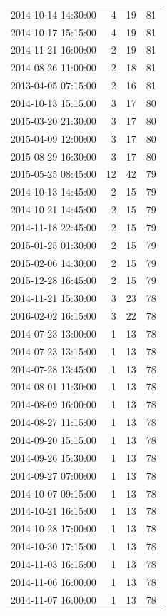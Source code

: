 \begin{tabular}{lrrr}
2014-10-14 14:30:00 & 4 & 19 & 81 \\
2014-10-17 15:15:00 & 4 & 19 & 81 \\
2014-11-21 16:00:00 & 2 & 19 & 81 \\
2014-08-26 11:00:00 & 2 & 18 & 81 \\
2013-04-05 07:15:00 & 2 & 16 & 81 \\
2014-10-13 15:15:00 & 3 & 17 & 80 \\
2015-03-20 21:30:00 & 3 & 17 & 80 \\
2015-04-09 12:00:00 & 3 & 17 & 80 \\
2015-08-29 16:30:00 & 3 & 17 & 80 \\
2015-05-25 08:45:00 & 12 & 42 & 79 \\
2014-10-13 14:45:00 & 2 & 15 & 79 \\
2014-10-21 14:45:00 & 2 & 15 & 79 \\
2014-11-18 22:45:00 & 2 & 15 & 79 \\
2015-01-25 01:30:00 & 2 & 15 & 79 \\
2015-02-06 14:30:00 & 2 & 15 & 79 \\
2015-12-28 16:45:00 & 2 & 15 & 79 \\
2014-11-21 15:30:00 & 3 & 23 & 78 \\
2016-02-02 16:15:00 & 3 & 22 & 78 \\
2014-07-23 13:00:00 & 1 & 13 & 78 \\
2014-07-23 13:15:00 & 1 & 13 & 78 \\
2014-07-28 13:45:00 & 1 & 13 & 78 \\
2014-08-01 11:30:00 & 1 & 13 & 78 \\
2014-08-09 16:00:00 & 1 & 13 & 78 \\
2014-08-27 11:15:00 & 1 & 13 & 78 \\
2014-09-20 15:15:00 & 1 & 13 & 78 \\
2014-09-26 15:30:00 & 1 & 13 & 78 \\
2014-09-27 07:00:00 & 1 & 13 & 78 \\
2014-10-07 09:15:00 & 1 & 13 & 78 \\
2014-10-21 16:15:00 & 1 & 13 & 78 \\
2014-10-28 17:00:00 & 1 & 13 & 78 \\
2014-10-30 17:15:00 & 1 & 13 & 78 \\
2014-11-03 16:15:00 & 1 & 13 & 78 \\
2014-11-06 16:00:00 & 1 & 13 & 78 \\
2014-11-07 16:00:00 & 1 & 13 & 78 \\

\end{tabular}
